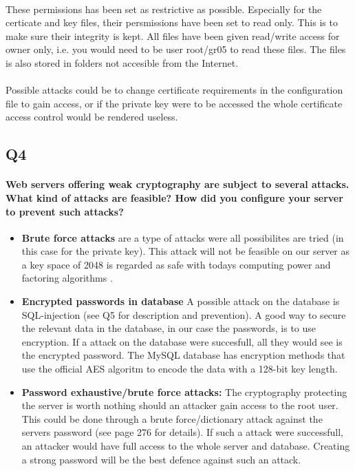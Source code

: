 \documentclass[a4paper,11pt]{article}
\begin{document}
\paragraph{} These permissions has been set as restrictive as possible. Especially for the certicate and key files, their persmissions have been set to read only. This is to make sure their integrity is kept. All files have been given read/write access for owner only, i.e. you would need to be user root/gr05 to read these files. The files is also stored in folders not accesible from the Internet.
\paragraph{}Possible attacks could be to change certificate requirements in the configuration file to gain access, or if the private key were to be accessed the whole certificate access control would be rendered useless.
\subsection{Q4}
\paragraph{Web servers offering weak cryptography are subject to several attacks. What kind of attacks are feasible? How did you conﬁgure your server to prevent such attacks?}
\begin{itemize}
	\item \textbf{Brute force attacks} are a type of attacks were all possibilites are tried (in this case for the private key). This attack will not be feasible on our server as a key space of 2048 is regarded as safe with todays computing power and factoring algorithms \cite{5}.
	\item \textbf{Encrypted passwords in database} A possible attack on the database is SQL-injection (see Q5 for description and prevention). A good way to secure the relevant data in the database, in our case the passwords, is to use encryption. If a attack on the database were succesfull, all they would see is the encrypted password. The MySQL database has encryption methods that use the official AES algoritm to encode the data with a 128-bit key length.
	\item \textbf{Password exhaustive/brute force attacks:} The cryptography protecting the server is worth nothing should an attacker gain access to the root user. This could be done through a brute force/dictionary attack against the servers password (see \cite{6} page  276 for details). If such a attack were successfull, an attacker would have full access to the whole server and database. Creating a strong password will be the best defence against such an attack.
\end{itemize}
\end{document}
